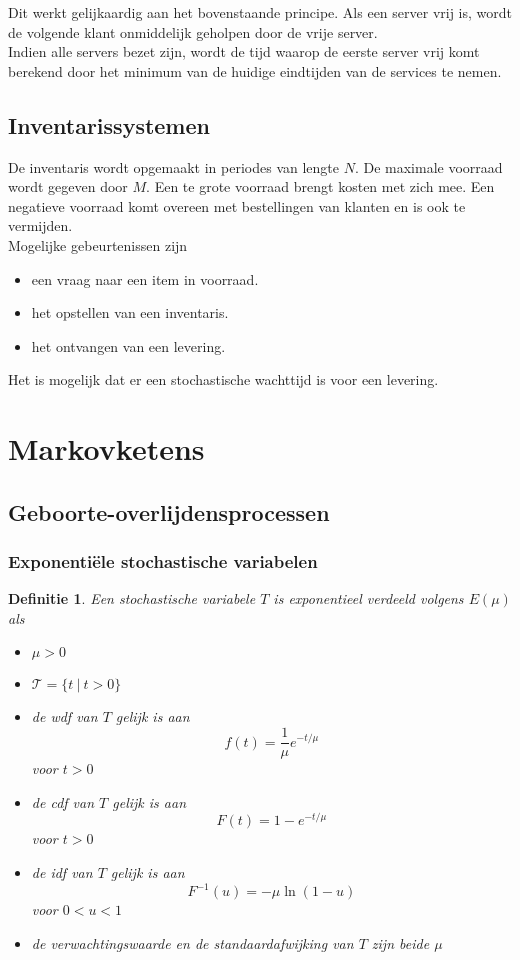 \documentclass{article}
\newtheorem{mydef}{Definitie}
\begin{document}
	Dit werkt gelijkaardig aan het bovenstaande principe. Als een server vrij is, wordt de volgende klant onmiddelijk geholpen door de vrije server.\\
	
	Indien alle servers bezet zijn, wordt de tijd waarop de eerste server vrij komt berekend door het minimum van de huidige eindtijden van de services te nemen.
	

	
	\subsection{Inventarissystemen}
	
	De inventaris wordt opgemaakt in periodes van lengte $N$. De maximale voorraad wordt gegeven door $M$. Een te grote voorraad brengt kosten met zich mee. Een negatieve voorraad komt overeen met bestellingen van klanten en is ook te vermijden.\\
	
	Mogelijke gebeurtenissen zijn
	\begin{itemize}
		\item een vraag naar een item in voorraad.
		\item het opstellen van een inventaris.
		\item het ontvangen van een levering.
	\end{itemize}

	Het is mogelijk dat er een stochastische wachttijd is voor een levering.
	
	\section{Markovketens}
	
	\subsection{Geboorte-overlijdensprocessen}
	
	\subsubsection{Exponentiële stochastische variabelen}
	
	\begin{mydef}
		Een stochastische variabele $T$ is exponentieel verdeeld volgens $E(\mu)$ als
		\begin{itemize}
			\item $\mu >0$
			\item $\mathcal{T} = \{t\ |\ t > 0\}$
			\item de wdf van $T$ gelijk is aan
				$$
					f(t) = \frac{1}{\mu}e^{-t/\mu}
				$$
				voor $t>0$
			\item de cdf van $T$ gelijk is aan
				$$
					F(t) =  1-e^{-t/\mu}
				$$
				voor $t>0$
			\item de idf van $T$ gelijk is aan 
				$$
					F^{-1}(u) = -\mu \ln(1-u)
				$$
				voor $0<u<1$
			\item de verwachtingswaarde en de standaardafwijking van $T$ zijn beide $\mu$				
		\end{itemize}
	\end{mydef}
\end{document}
